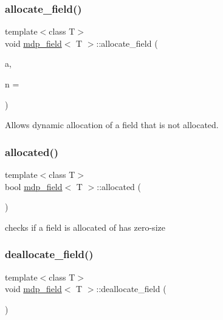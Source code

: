 \subsubsection{\texorpdfstring{allocate\+\_\+field()}{allocate\_field()}}
{\footnotesize\ttfamily template$<$class T$>$ \\
void \hyperlink{classmdp__field}{mdp\+\_\+field}$<$ T $>$\+::allocate\+\_\+field (\begin{DoxyParamCaption}\item[{\hyperlink{classmdp__lattice}{mdp\+\_\+lattice} \&}]{a,  }\item[{int}]{n = {} }\end{DoxyParamCaption})\hspace{0.3cm}{\ttfamily [inline]}}



Allows dynamic allocation of a field that is not allocated. 

\mbox{\label{classmdp__field_ad306195eb4961253cef69e5fb33bce69}} 
\subsubsection{\texorpdfstring{allocated()}{allocated()}}
{\footnotesize\ttfamily template$<$class T$>$ \\
bool \hyperlink{classmdp__field}{mdp\+\_\+field}$<$ T $>$\+::allocated (\begin{DoxyParamCaption}{ }\end{DoxyParamCaption})\hspace{0.3cm}{\ttfamily [inline]}}



checks if a field is allocated of has zero-\/size 

\mbox{\label{classmdp__field_ab063254fe74b88b1c9cc9e0cbc843b4b}} 
\subsubsection{\texorpdfstring{deallocate\+\_\+field()}{deallocate\_field()}}
{\footnotesize\ttfamily template$<$class T$>$ \\
void \hyperlink{classmdp__field}{mdp\+\_\+field}$<$ T $>$\+::deallocate\+\_\+field (\begin{DoxyParamCaption}{ }\end{DoxyParamCaption})\hspace{0.3cm}{\ttfamily [inline]}}



